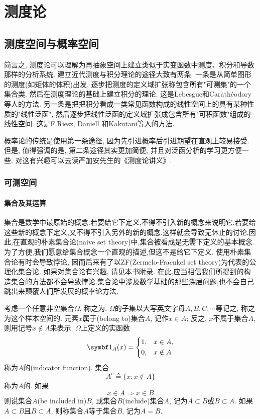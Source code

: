 
\part{测度论}


\chapter{测度空间与概率空间}
简言之, 测度论可以理解为再抽象空间上建立类似于实变函数中测度、积分和导数那样的分析系统. 建立近代测度与积分理论的途径大致有两条. 一条是从简单图形的测度(如矩体的体积)出发, 逐步把测度的定义域扩张称包含所有"可测集"的一个集合类. 然后在测度理论的基础上建立积分的理论. 这是Lebesgue和Carathéodory等人的方法. 另一条是把把积分看成一类常见函数构成的线性空间上的具有某种性质的"线性泛函", 然后逐步把线性泛函的定义域扩张成包含所有"可积函数"组成的线性空间. 这是F.Riesz, Daniell 和Kakutani等人的方法. 

概率论的传统是使用第一条途径, 因为先引进概率后引进期望在直观上较易接受. 但是, 值得强调的是, 第二条途径其实更加简便, 并且对泛函分析的学习更方便一些. 对这有兴趣可以去读严加安先生的《测度论讲义》.


\section{可测空间}
\subsection{集合及其运算}
集合是数学中最原始的概念.若要给它下定义,不得不引入新的概念来说明它.若要给这些新的概念下定义,又不得不引入另外的新的概念.这样就会导致无休止的讨论.因此,在直观的朴素集合论(naive set theory)中,集合被看成是无需下定义的基本概念.为了方便,我们愿意给集合概念一个直观的描述,但这不是给它下定义. 使用朴素集合论有时会导致悖论, 因而后来有了以ZF(Zermelo-Fraenkel set theory)为代表的公理化集合论. 如果对集合论有兴趣, 请见本书附录. 在此,应当相信我们所提到的构造集合的方法都不会导致悖论.集合论中涉及数学基础的那些深层问题,也不会自己跳出来颠覆人们所发展的概率论方法. 

考虑一个任意非空集合$\Omega$, 称之为. $\Omega$的子集以大写英文字母$A,B,C,\cdots$等记之, 称之为这个样本空间的. 元素$x$属于(belong to)集合$A$, 记作$x\in A$; 反之, $x$不属于集合$A$, 则用记号$x\notin A$来表示. $\Omega$上定义的实函数
\begin{equation}
\bm{1}_{A}(x) = \begin{dcases}
1, &x\in A,\\
0, &x\notin A
\end{dcases}
\end{equation}
称为$A$的(indicator function). 集合\begin{equation}
A^c \triangleq \{ x:x\notin A \}
\end{equation}
称为$A$的. 如果
\begin{equation}
x\in A\Rightarrow x\in B
\end{equation}
则说集合$A$(be included in)$B$, 或集合$B$(include)集合$A$, 记为$A\subset B$或$B\subset A$. 如果$A\subset B$且$B\subset A$, 则称集合$A$等于集合$B$, 记为$A = B$.

